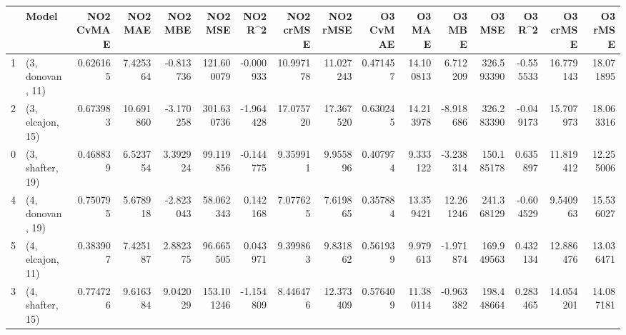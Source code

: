 \begin{tabular}{llrrrrrrrrrrrrrr}
\toprule
{} &             Model &  NO2 CvMAE &    NO2 MAE &   NO2 MBE &     NO2 MSE &   NO2 R\textasciicircum2 &  NO2 crMSE &   NO2 rMSE &  O3 CvMAE &     O3 MAE &     O3 MBE &      O3 MSE &    O3 R\textasciicircum2 &   O3 crMSE &    O3 rMSE \\
\midrule
1 &  (3, donovan, 11) &   0.626165 &   7.425364 & -0.813736 &  121.600079 & -0.000933 &  10.997178 &  11.027243 &  0.471457 &  14.100813 &   6.712209 &  326.593390 & -0.555533 &  16.779143 &  18.071895 \\
2 &  (3, elcajon, 15) &   0.673983 &  10.691860 & -3.170258 &  301.630736 & -1.964428 &  17.075720 &  17.367520 &  0.630245 &  14.213978 &  -8.918686 &  326.283390 & -0.049173 &  15.707973 &  18.063316 \\
0 &  (3, shafter, 19) &   0.468839 &   6.523754 &  3.392924 &   99.119856 & -0.144775 &   9.359911 &   9.955896 &  0.407974 &   9.333122 &  -3.238314 &  150.185178 &  0.635897 &  11.819412 &  12.255006 \\
4 &  (4, donovan, 19) &   0.750795 &   5.678918 & -2.823043 &   58.062343 &  0.142168 &   7.077625 &   7.619865 &  0.357884 &  13.359421 &  12.261246 &  241.368129 & -0.604529 &   9.540963 &  15.536027 \\
5 &  (4, elcajon, 11) &   0.383907 &   7.425187 &  2.882375 &   96.665505 &  0.043971 &   9.399863 &   9.831862 &  0.561939 &   9.979613 &  -1.971874 &  169.949563 &  0.432134 &  12.886476 &  13.036471 \\
3 &  (4, shafter, 15) &   0.774726 &   9.616384 &  9.042029 &  153.101246 & -1.154809 &   8.446476 &  12.373409 &  0.576409 &  11.380114 &  -0.963382 &  198.448664 &  0.283465 &  14.054201 &  14.087181 \\
\bottomrule
\end{tabular}
